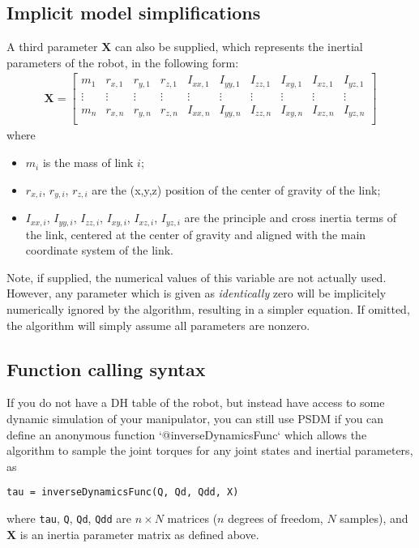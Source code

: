 \documentclass[12pt]{article}
\renewcommand{\b}[1]{\mathbf{#1}}
\begin{document}
\subsection{Implicit model simplifications}
A third parameter $\mathbf{X}$ can also be supplied, which represents the inertial parameters of the robot, in the following form:
\begin{align}
	\b{X} = \begin{bmatrix}
		m_1 & r_{x,1} & r_{y,1} & r_{z,1} & I_{xx,1} & I_{yy,1} & I_{zz,1} & I_{xy,1} & I_{xz,1} & I_{yz,1}\\
		\vdots &\vdots &\vdots &\vdots &\vdots &\vdots&\vdots&\vdots&\vdots&\vdots\\
		m_n & r_{x,n} & r_{y,n} & r_{z,n} & I_{xx,n} & I_{yy,n} & I_{zz,n} & I_{xy,n} & I_{xz,n} & I_{yz,n}\\
	\end{bmatrix}
\end{align}
where
\begin{itemize}[itemsep=0pt]
	\item $m_i$ is the mass of link $i$;
	\item $r_{x,i}$, $r_{y,i}$, $r_{z,i}$ are the (x,y,z) position of the center of gravity of the link;
	\item $I_{xx,i}$, $I_{yy,i}$, $I_{zz,i}$, $I_{xy,i}$, $I_{xz,i}$, $I_{yz,i}$ are the principle and cross inertia terms of the link, centered at the center of gravity and aligned with the main coordinate system of the link.
\end{itemize}
Note, if supplied, the numerical values of this variable are not actually used. However, any parameter which is given as \textit{identically} zero will be implicitely numerically ignored by the algorithm, resulting in a simpler equation. If omitted, the algorithm will simply assume all parameters are nonzero.

\subsection{Function calling syntax}

If you do not have a DH table of the robot, but instead have access to some dynamic simulation of your manipulator, you can still use PSDM if you can define an anonymous function `@inverseDynamicsFunc` which allows the algorithm to sample the joint torques for any joint states and inertial parameters, as
\begin{lstlisting}
tau = inverseDynamicsFunc(Q, Qd, Qdd, X)
\end{lstlisting}\vspace{1em}
where \texttt{tau}, \texttt{Q}, \texttt{Qd}, \texttt{Qdd} are $n \times N$ matrices ($n$ degrees of freedom, $N$ samples), and $\mathbf{X}$ is an inertia parameter matrix as defined above.
\end{document}
